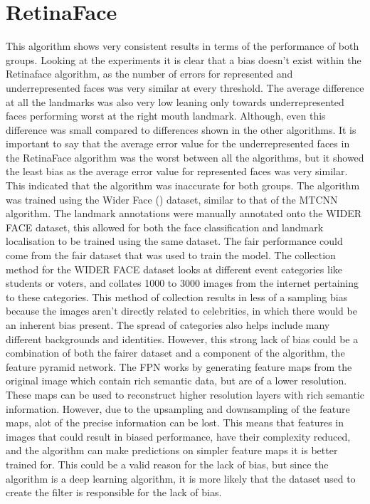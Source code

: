 \documentclass{l4proj}
\begin{document}
\section{RetinaFace}
This algorithm shows very consistent results in terms of the performance of both groups. Looking at the experiments it is clear that a bias doesn't exist within the Retinaface algorithm, as the number of errors for represented and underrepresented faces was very similar at every threshold. The average difference at all the landmarks was also very low leaning only towards underrepresented faces performing worst at the right mouth landmark. Although, even this difference was small compared to differences shown in the other algorithms. It is important to say that the average error value for the underrepresented faces in the RetinaFace algorithm was the worst between all the algorithms, but it showed the least bias as the average error value for represented faces was very similar. This indicated that the algorithm was inaccurate for both groups. The algorithm was trained using the Wider Face (\cite{widerface}) dataset, similar to that of the MTCNN algorithm. The landmark annotations were manually annotated onto the WIDER FACE dataset, this allowed for both the face classification and landmark localisation to be trained using the same dataset. The fair performance could come from the fair dataset that was used to train the model. The collection method for the WIDER FACE dataset looks at different event categories like students or voters, and collates 1000 to 3000 images from the internet pertaining to these categories. This method of collection results in less of a sampling bias because the images aren't directly related to celebrities, in which there would be an inherent bias present. The spread of categories also helps include many different backgrounds and identities. However, this strong lack of bias could be a combination of both the fairer dataset and a component of the algorithm, the feature pyramid network. The FPN works by generating feature maps from the original image which contain rich semantic data, but are of a lower resolution. These maps can be used to reconstruct higher resolution layers with rich semantic information. However, due to the upsampling and downsampling of the feature maps, alot of the precise information can be lost. This means that features in images that could result in biased performance, have their complexity reduced, and the algorithm can make predictions on simpler feature maps it is better trained for. This could be a valid reason for the lack of bias, but since the algorithm is a deep learning algorithm, it is more likely that the dataset used to create the filter is responsible for the lack of bias.
\end{document}
